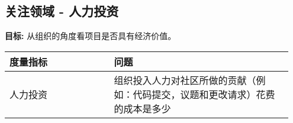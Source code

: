 
    \subsection{关注领域 - 人力投资}
    \textbf{目标:} 从组织的角度看项目是否具有经济价值。
    \begin{table}[ht!]
        \centering
        \begin{tabular}{|p{0.35\linewidth} | p{0.6\linewidth}|}
            \hline
            \hfil \textbf{度量指标}  & \hfil \textbf{问题} \\
            \hline
        		人力投资 & 组织投入人力对社区所做的贡献（例如：代码提交，议题和更改请求）花费的成本是多少 \\ 
		\hline
    \end{tabular}
    \end{table}
        
 
